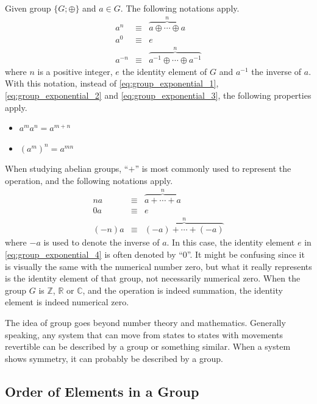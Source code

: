Given group $\{G;\oplus\}$ and $a\in G$. The following notations apply.
\begin{eqnarray}
  a^n &\equiv&  \overbrace{a \oplus \cdots \oplus a}^{n} \label{eq:group_exponential_1} \\
  a^0 &\equiv& e \label{eq:group_exponential_2} \\
  a^{-n} &\equiv& \overbrace{a^{-1} \oplus \cdots \oplus a^{-1}}^{n} \label{eq:group_exponential_3}
\end{eqnarray}
where $n$ is a positive integer, $e$ the identity element of $G$ and $a^{-1}$ the inverse of $a$. With this notation, instead of \eqref{eq:group_exponential_1}, \eqref{eq:group_exponential_2} and \eqref{eq:group_exponential_3}, the following properties apply.
\begin{itemize}
  \item $a^ma^n = a^{m+n}$
  \item $\left(a^m\right)^n = a^{mn}$
\end{itemize}

When studying abelian groups, ``$+$'' is most commonly used to represent the operation, and the following notations apply.
\begin{eqnarray}
  na &\equiv& \overbrace{a + \cdots + a}^{n} \nonumber \\
  0a &\equiv& e \label{eq:group_exponential_4} \\
  (-n)a &\equiv& \overbrace{(-a) + \cdots + (-a)}^{n} \nonumber
\end{eqnarray}
where $-a$ is used to denote the inverse of $a$. In this case, the identity element $e$ in \eqref{eq:group_exponential_4} is often denoted by ``$0$''. It might be confusing since it is visually the same with the numerical number zero, but what it really represents is the identity element of that group, not necessarily numerical zero. When the group $G$ is $\mathbb{Z}$, $\mathbb{R}$ or $\mathbb{C}$, and the operation is indeed summation, the identity element is indeed numerical zero.

The idea of group goes beyond number theory and mathematics. Generally speaking, any system that can move from states to states with movements revertible can be described by a group or something similar. When a system shows symmetry, it can probably be described by a group.

\subsection{Order of Elements in a Group}

